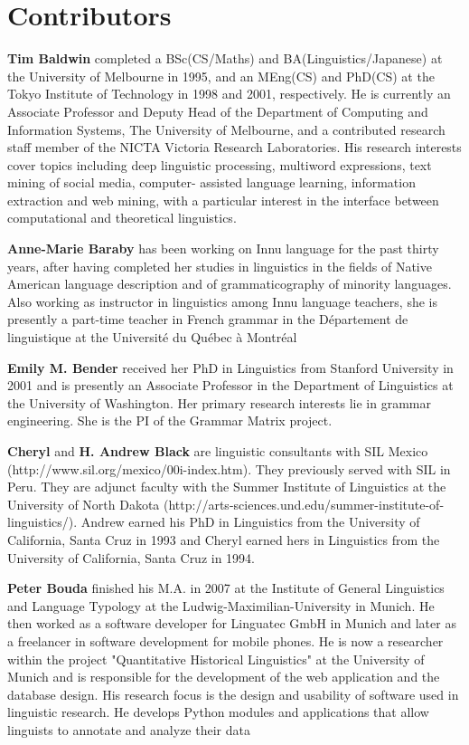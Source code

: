 \renewcommand\chapname{Contributors}	
\renewcommand\longchapname{Contributors}
\renewcommand\shortauthor{}
\renewcommand\longauthor{}
\chapter*{\longchapname} 
\mytoc{}  

\textbf{Tim Baldwin} completed a BSc(CS/Maths) and BA(Linguistics/Japanese)
at the University of Melbourne in 1995, and an MEng(CS) and PhD(CS) at
the Tokyo Institute of Technology in 1998 and 2001, respectively. He is
currently an Associate Professor and Deputy Head of the Department of
Computing and Information Systems, The University of Melbourne, and a
contributed research staff member of the NICTA Victoria Research
Laboratories. His research interests cover topics including deep linguistic
processing, multiword expressions, text mining of social media, computer-
assisted language learning, information extraction and web mining, with
a particular interest in the interface between computational and theoretical
linguistics.

\textbf{Anne-Marie Baraby} has been working on Innu language for the past thirty years, after having completed her studies in linguistics in the fields of Native American language description and of grammaticography of minority languages. Also working as instructor in linguistics among Innu language teachers, she is presently a part-time teacher in French grammar in the Département de linguistique at the Université du Québec à Montréal 

\textbf{Emily M. Bender} received her PhD in Linguistics from Stanford
University in 2001 and is presently an Associate Professor in the
Department of Linguistics at the University of Washington.  Her
primary research interests lie in grammar engineering.  She is the PI of
the Grammar Matrix project.

\textbf{Cheryl} and \textbf{ H. Andrew Black} are linguistic consultants with SIL Mexico (http://www.sil.org/mexico/00i-index.htm). They previously served with SIL in Peru.  They are adjunct faculty with the Summer Institute of Linguistics at the University of North Dakota (http://arts-sciences.und.edu/summer-institute-of-linguistics/). Andrew earned his PhD in Linguistics from the University of California, Santa Cruz in 1993 and Cheryl earned hers in Linguistics from the University of California, Santa Cruz in 1994.

\textbf{Peter Bouda} finished his M.A. in 2007 at the Institute of General Linguistics
and Language Typology at the Ludwig-Maximilian-University in Munich. He
then worked as a software developer for Linguatec GmbH in Munich and 
later as a freelancer in software development for mobile phones. He is now a
researcher within the project "Quantitative Historical Linguistics" at the University of Munich and is 
responsible for the development of the web application and the database 
design. His research focus is the design and usability of software used 
in linguistic research. He develops Python modules and applications that
 allow linguists to annotate and analyze their data


